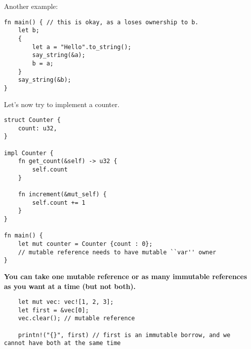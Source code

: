 \documentclass[12pt]{amsart}
\begin{document}
Another example:
\begin{lstlisting}
fn main() { // this is okay, as a loses ownership to b.
    let b;
    {
        let a = "Hello".to_string();
        say_string(&a);
        b = a;
    }
    say_string(&b);
}
\end{lstlisting}

Let's now try to implement a counter.

\begin{lstlisting}
struct Counter {
    count: u32,
}

impl Counter {
    fn get_count(&self) -> u32 {
        self.count
    }

    fn increment(&mut_self) {
        self.count += 1
    }
}

fn main() {
    let mut counter = Counter {count : 0}; 
    // mutable reference needs to have mutable ``var'' owner
}
\end{lstlisting}

\textbf{You can take one mutable reference or as many immutable references as you want at a time (but not both).}

\begin{lstlisting}
    let mut vec: vec![1, 2, 3];
    let first = &vec[0];
    vec.clear(); // mutable reference

    printn!("{}", first) // first is an immutable borrow, and we cannot have both at the same time
\end{lstlisting}
\end{document}
